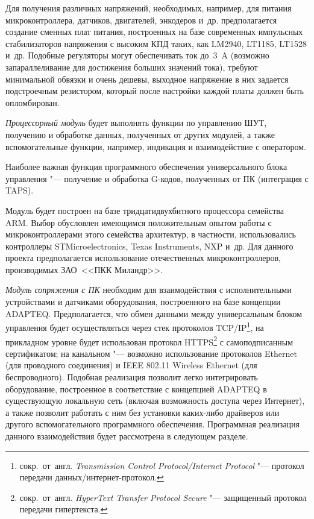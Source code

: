 Для получения различных напряжений, необходимых, например, для питания микроконтроллера, датчиков, двигателей, энкодеров и~др. предполагается создание сменных плат питания, построенных на базе современных импульсных стабилизаторов напряжения с высоким КПД таких, как \foreignlanguage{english}{LM}2940, \foreignlanguage{english}{LT}1185, \foreignlanguage{english}{LT}1528 и~др. Подобные регуляторы могут обеспечивать ток до~\SI{3}{\ampere} (возможно запараллеливание для достижения больших значений тока), требуют минимальной обвязки и очень дешевы, выходное напряжение в них задается подстроечным резистором, который после настройки каждой платы должен быть опломбирован.

\textit{Процессорный модуль} будет выполнять функции по управлению ШУТ, получению и обработке данных, полученных от других модулей, а также вспомогательные функции, например, индикация и взаимодействие с оператором.

Наиболее важная функция программного обеспечения универсального блока управления "--- получение и обработка \foreignlanguage{english}{G}-кодов, полученных от ПК (интеграция с \foreignlanguage{english}{TAPS}).

Модуль будет построен на базе тридцатидвухбитного процессора семейства \foreignlanguage{english}{ARM}. Выбор обусловлен имеющимся положительным опытом работы с микроконтроллерами этого семейства архитектур, в частности, использовались контроллеры \foreignlanguage{english}{STMicroelectronics}, \foreignlanguage{english}{Texas Instruments}, \foreignlanguage{english}{NXP} и~др. Для данного проекта предполагается использование отечественных микроконтроллеров, производимых ЗАО~<<ПКК Миландр>>.

\textit{Модуль сопряжения с ПК} необходим для взаимодействия с исполнительными устройствами и датчиками оборудования, построенного на базе концепции \foreignlanguage{english}{ADAPTEQ}. Предполагается, что обмен данными между универсальным блоком управления будет осуществляться через стек протоколов \foreignlanguage{english}{TCP/IP}\footnote{сокр.~от~англ. \textit{Transmission Control Protocol/Internet Protocol} "--- протокол передачи данных/интернет-протокол.}, на прикладном уровне будет использован протокол \foreignlanguage{english}{HTTPS}\footnote{сокр.~от~англ. \textit{HyperText Transfer Protocol Secure} "--- защищенный протокол передачи гипертекста.} с самоподписанным сертификатом; на канальном "--- возможно использование протоколов \foreignlanguage{english}{Ethernet} (для проводного соединения) и IEEE 802.11 Wireless Ethernet (для беспроводного). Подобная реализация позволит легко интегрировать оборудование, построенное в соответствие с концепцией \foreignlanguage{english}{ADAPTEQ} в существующую локальную сеть (включая возможность доступа через Интернет), а также позволит работать с ним без установки каких-либо драйверов или другого вспомогательного программного обеспечения. Программная реализация данного взаимодействия будет рассмотрена в следующем разделе.

